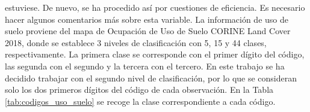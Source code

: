 \documentclass[12pt,a4paper,]{book}
\numberwithin{dummy}{section}
\theoremstyle{ocrenumbox}
\theoremstyle{blacknumex}
\theoremstyle{blacknumbox}
\theoremstyle{ocrenum}
\theoremstyle{ocrenum}
\begin{document}
\begin{itemize}
\begin{itemize}
    estuviese. De nuevo, se ha procedido así por cuestiones de
    eficiencia. Es necesario hacer algunos comentarios más sobre esta
    variable. La información de uso de suelo proviene del mapa de
    Ocupación de Uso de Suelo CORINE Land Cover 2018, donde se establece
    3 niveles de clasificación con 5, 15 y 44 clases, respectivamente.
    La primera clase se corresponde con el primer dígito del código, las
    segunda con el segundo y la tercera con el tercero. En este trabajo
    se ha decidido trabajar con el segundo nivel de clasificación, por
    lo que se consideran solo los dos primeros dígitos del código de
    cada observación. En la Tabla \ref{tab:codigos_uso_suelo} se recoge
    la clase correspondiente a cada código.
  \end{itemize}
\end{itemize}
\end{document}
